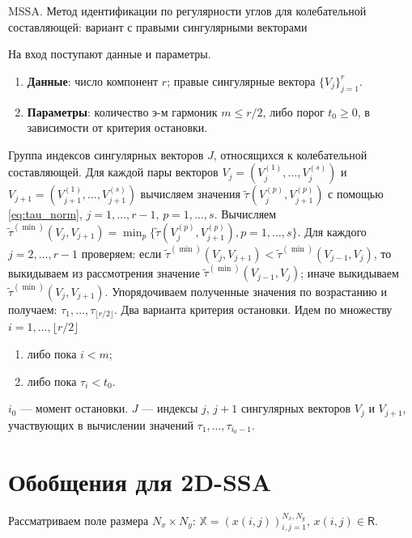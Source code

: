 \documentclass[specialist,
               substylefile = spbu.rtx,
               subf,href,colorlinks=true, 12pt]{disser}
\begin{document}
\begin{algorithm}[!hhh]
\caption{MSSA. Метод идентификации по регулярности углов для колебательной составляющей: вариант с правыми сингулярными векторами}
\label{alg:tau_mssa_fac}
\begin{algorithmic}[1]
\REQUIRE На вход поступают данные и параметры.
\begin{enumerate}
\item \textbf{Данные}: число компонент $r$; правые сингулярные вектора $\{V_j\}_{j=1}^{r}$.\\
\item \textbf{Параметры}: количество э-м гармоник $m \leqslant r/2$, либо порог $t_0 \geqslant 0$, в зависимости от критерия остановки.
\end{enumerate}
\ENSURE Группа индексов сингулярных векторов $J$, относящихся к колебательной составляющей.
\STATE 
Для каждой пары векторов $V_{j} = (V_j^{(1)}, \ldots, V_j^{(s)})$ и $V_{j+1} = (V_{j+1}^{(1)}, \ldots, V_{j+1}^{(s)})$ 
вычисляем значения $\tilde{\tau}(V_j^{(p)}, V_{j+1}^{(p)})$ с помощью \eqref{eq:tau_norm}, $j=1,\ldots, r-1$, $p=1,\ldots,s$.
\STATE Вычисляем $\tilde{\tau}^{(\min)}(V_j, V_{j+1}) =\min_p \{ \tilde{\tau}(V_j^{(p)}, V_{j+1}^{(p)}), p=1,\ldots,s \}$.
\STATE Для каждого $j = 2,\ldots,r-1$ проверяем: если $\tilde{\tau}^{(\min)}(V_j, V_{j+1})< \tilde{\tau}^{(\min)}(V_{j-1}, V_{j})$, то выкидываем из рассмотрения значение $\tilde{\tau}^{(\min)}(V_{j-1}, V_{j})$; иначе выкидываем $\tilde{\tau}^{(\min)}(V_j, V_{j+1})$.
 Упорядочиваем полученные значения по возрастанию и получаем: $\tau_1, \ldots, \tau_{\lfloor r/2 \rfloor}$.
\STATE Два варианта критерия остановки. Идем по множеству $i=1,\ldots,\lfloor r/2 \rfloor$
\begin{enumerate}
\item либо пока $i < m$;
\item либо пока $\tau_i < t_0$.
\end{enumerate}
$i_0$ --- момент остановки.
\STATE $J$ --- индексы $j$, $j+1$ сингулярных векторов $V_j$ и $V_{j+1}$, участвующих в вычислении  значений $\tau_1, \ldots, \tau_{i_0 - 1}$.
\end{algorithmic}
\end{algorithm}


\newpage
\section{Обобщения для 2D-SSA}

Рассматриваем поле размера $N_x \times N_y$: $\mathbb{X}= \left(x(i,j) \right)_{i,j=1}^{N_x,N_y}$, $x(i,j) \in \mathsf{R}$.
\end{document}
